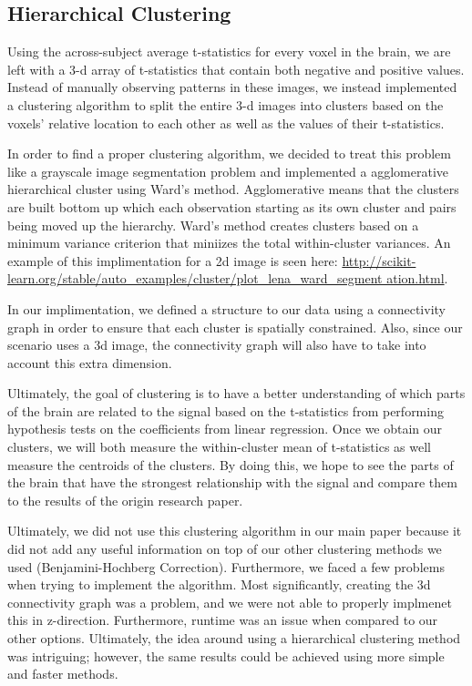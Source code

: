 \subsection{Hierarchical Clustering}

\par Using the across-subject average t-statistics for every voxel in the
brain, we are left with a 3-d array of t-statistics that contain both negative
and positive values. Instead of manually observing patterns in these images, we
instead implemented a clustering algorithm to split the entire 3-d images into
clusters based on the voxels' relative location to each other as well as the
values of their t-statistics.

\par In order to find a proper clustering algorithm, we decided to treat this
problem like a grayscale image segmentation problem and implemented a
agglomerative hierarchical cluster using Ward's method. Agglomerative means
that the clusters are built bottom up which each observation starting as its
own cluster and pairs being moved up the hierarchy. Ward's method creates
clusters based on a minimum variance criterion that miniizes the total
within-cluster variances. An example of this implimentation for a 2d image is
seen here:
\url{http://scikit-learn.org/stable/auto_examples/cluster/plot_lena_ward_segment
 ation.html}.

In our implimentation, we defined a structure to our data using a connectivity
graph in order to ensure that each cluster is spatially constrained. Also,
since our scenario uses a 3d image, the connectivity graph will also have to
take into account this extra dimension.

\par Ultimately, the goal of clustering is to have a better understanding of
which parts of the brain are related to the signal based on the t-statistics
from performing hypothesis tests on the coefficients from linear regression.
Once we obtain our clusters, we will both measure the within-cluster mean of
t-statistics as well measure the centroids of the clusters. By doing this, we
hope to see the parts of the brain that have the strongest relationship with
the signal and compare them to the results of the origin research paper.

\par Ultimately, we did not use this clustering algorithm in our main paper
because it did not add any useful information on top of our other clustering
methods we used (Benjamini-Hochberg Correction). Furthermore, we faced a few
problems when trying to implement the algorithm. Most significantly, creating
the 3d connectivity graph was a problem, and we were not able to properly
implmenet this in z-direction. Furthermore, runtime was an issue when compared
to our other options. Ultimately, the idea around using a hierarchical
clustering method was intriguing; however, the same results could be achieved
using more simple and faster methods.
